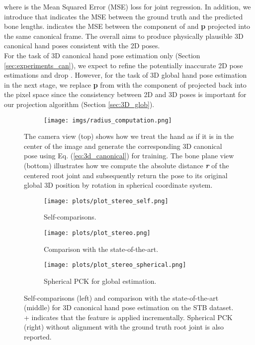 \documentclass[10pt,twocolumn,letterpaper]{article}
\begin{document}
where  is the Mean Squared Error (MSE) loss for joint regression. In addition, we introduce  that indicates the MSE between the ground truth and the predicted bone lengths.  indicates the MSE between the  component of  and \textbf{p} projected into the same canonical frame. The overall  aims to produce physically plausible 3D canonical hand poses consistent with the 2D poses.\\
\indent For the task of 3D canonical hand pose estimation only (Section \ref{sec:experiments_can}), we expect \textit{} to refine the potentially inaccurate 2D pose estimations and drop . However, for the task of 3D global hand pose estimation in the next stage, we replace \textbf{p} from \textit{} with the  component of  projected back into the pixel space since the consistency between 2D and 3D poses is important for our projection algorithm (Section \ref{sec:3D_glob}).
\begin{figure}[t]
  \centering
  \begin{subfigure}[b]{0.9\linewidth}
    \texttt{[image: imgs/radius\_computation.png]}
  \end{subfigure}
  \caption{The camera view (top) shows how we treat the hand as if it is in the center of the image and generate the corresponding 3D canonical pose using Eq. (\ref{eq:3d_canonical}) for training. The bone plane view (bottom) illustrates how we compute the absolute distance \textbf{\textit{r}} of the centered root joint and subsequently return the pose to its original global 3D position by rotation in spherical coordinate system.}
  \label{fig:radius_img}
\vspace{-1mm}
\end{figure}
\begin{figure*}[t]
  \centering
  \begin{subfigure}[t]{0.32\linewidth}
\texttt{[image: plots/plot\_stereo\_self.png]}
    \caption{Self-comparisons.}\label{fig:stereo_eval1}
  \end{subfigure}
  \begin{subfigure}[t]{0.32\linewidth}
\texttt{[image: plots/plot\_stereo.png]}
    \caption{Comparison with the state-of-the-art.}\label{fig:stereo_eval2}
  \end{subfigure}
  \begin{subfigure}[t]{0.32\linewidth}
\texttt{[image: plots/plot\_stereo\_spherical.png]}
    \caption{Spherical PCK for global estimation.}\label{fig:stereo_eval3}
  \end{subfigure}
  \vspace{0.2cm}
  \caption{Self-comparisons (left) and comparison with the state-of-the-art (middle) for 3D canonical hand pose estimation on the STB dataset. + indicates that the feature is applied incrementally. Spherical PCK (right) without alignment with the ground truth root joint is also reported.}
\label{fig:plots_eval}
\end{figure*}
\end{document}
